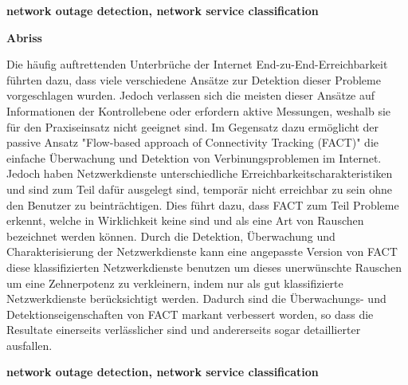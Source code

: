 \vspace{10em} 
\begin{center}
	\textbf{network outage detection, network service classification} \par 
\end{center}

\vfil

\newpage
\clearpage \null 
\vfil 
\begin{center}
	\textbf{Abriss} 
\end{center}

Die häufig auftrettenden Unterbrüche der Internet End-zu-End-Erreichbarkeit führten dazu, dass viele verschiedene Ansätze zur Detektion dieser Probleme vorgeschlagen wurden.
Jedoch verlassen sich die meisten dieser Ansätze auf Informationen der Kontrollebene oder erfordern aktive Messungen, weshalb sie für den Praxiseinsatz nicht geeignet sind.
Im Gegensatz dazu ermöglicht der passive Ansatz "Flow-based approach of Connectivity Tracking (FACT)" die einfache Überwachung und Detektion von Verbinungsproblemen im Internet. 
Jedoch haben Netzwerkdienste unterschiedliche Erreichbarkeitscharakteristiken und sind zum Teil dafür ausgelegt sind, temporär nicht erreichbar zu sein ohne den Benutzer zu beinträchtigen. 
Dies führt dazu, dass FACT zum Teil Probleme erkennt, welche in Wirklichkeit keine sind und als eine Art von Rauschen bezeichnet werden können. 
Durch die Detektion, Überwachung und Charakterisierung der Netzwerkdienste kann eine angepasste Version von FACT diese klassifizierten Netzwerkdienste benutzen um dieses unerwünschte Rauschen um eine Zehnerpotenz zu verkleinern, indem nur als gut klassifizierte Netzwerkdienste berücksichtigt werden.
Dadurch sind die Überwachungs- und Detektionseigenschaften von FACT markant verbessert worden, so dass die Resultate einerseits verlässlicher sind und andererseits sogar detaillierter ausfallen. 

\vspace{10em} 
\begin{center}
	\textbf{network outage detection, network service classification} \par 
\end{center}

\vfil
